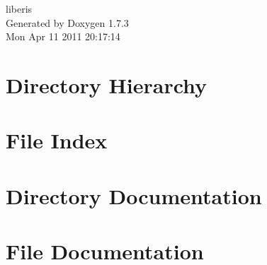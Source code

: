 \documentclass[a4paper]{book}
\begin{document}
\hypersetup{pageanchor=false}
\begin{titlepage}
\vspace*{7cm}
\begin{center}
{\Large liberis }\\
\vspace*{1cm}
{\large Generated by Doxygen 1.7.3}\\
\vspace*{0.5cm}
{\small Mon Apr 11 2011 20:17:14}\\
\end{center}
\end{titlepage}
\clearemptydoublepage
{}
\tableofcontents
\clearemptydoublepage
{}
\hypersetup{pageanchor=true}
\chapter{Directory Hierarchy}

\chapter{File Index}

\chapter{Directory Documentation}



\chapter{File Documentation}











\printindex
\end{document}
